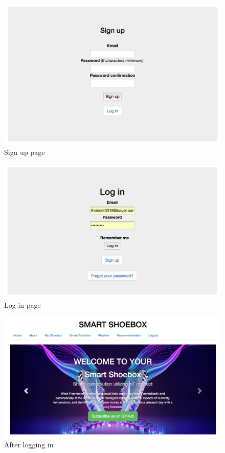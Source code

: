 \documentclass[conference]{IEEEtran}
\begin{document}
\begin{figure}[h]
\begin{center}
    \includegraphics[scale=0.3]{capture1}
     \caption{Sign up page}\label{fig:label}
\end{center}
\end{figure}
\begin{figure}[h]
\begin{center}
    \includegraphics[scale=0.3]{capture2}
     \caption{Log in page}\label{fig:label}
\end{center}
\end{figure}
\begin{figure}[h]
\begin{center}
    \includegraphics[scale=0.25]{capture3}
     \caption{After logging in}\label{fig:label}
\end{center}
\end{figure}
\end{document}
